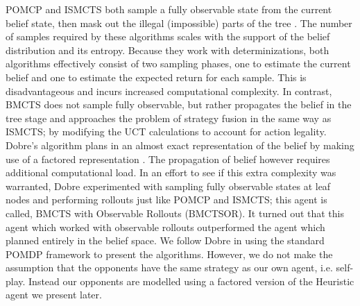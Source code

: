 \documentclass[msc, deptreport, ai, romanprepages]{infthesis}
\begin{document}
POMCP and ISMCTS both sample a fully observable state from the current belief state, then mask out the illegal (impossible) parts of the tree \cite{Mihai}. The number of samples required by these algorithms scales with the support of the belief distribution and its entropy. Because they work with determinizations, both algorithms effectively consist of two sampling phases, one to estimate the current belief and one to estimate the expected return for each sample. This is disadvantageous and incurs increased computational complexity. In contrast, BMCTS does not sample fully observable, but rather propagates the belief in the tree stage and approaches the problem of strategy fusion in the same way as ISMCTS; by modifying the UCT calculations to account for action legality. Dobre’s algorithm plans in an almost exact representation of the belief by making use of a factored representation \cite{Mihai}. The propagation of belief however requires additional computational load. In an effort to see if this extra complexity was warranted, Dobre experimented with sampling fully observable states at leaf nodes and performing rollouts just like POMCP and ISMCTS; this agent is called, BMCTS with Observable Rollouts (BMCTSOR). It turned out that this agent which worked with observable rollouts outperformed the agent which planned entirely in the belief space. We follow Dobre in using the standard POMDP framework to present the algorithms. However, we do not make the assumption that the opponents have the same strategy as our own agent, i.e. self-play. Instead our opponents are modelled using a factored version of the Heuristic agent we present later.
\end{document}
